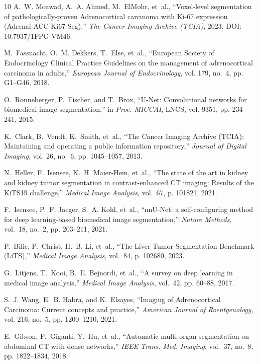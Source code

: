 \documentclass[conference]{IEEEtran}
\begin{document}
\begin{thebibliography}{10}
A.~W. Moawad, A.~A. Ahmed, M.~ElMohr, et~al., ``Voxel-level segmentation of pathologically-proven Adrenocortical carcinoma with Ki-67 expression (Adrenal-ACC-Ki67-Seg),'' \emph{The Cancer Imaging Archive (TCIA)}, 2023. DOI: 10.7937/1FPG-VM46.

M.~Fassnacht, O.~M. Dekkers, T.~Else, et~al., ``European Society of Endocrinology Clinical Practice Guidelines on the management of adrenocortical carcinoma in adults,'' \emph{European Journal of Endocrinology}, vol. 179, no.~4, pp. G1--G46, 2018.

O.~Ronneberger, P.~Fischer, and T.~Brox, ``U-Net: Convolutional networks for biomedical image segmentation,'' in \emph{Proc. MICCAI}, LNCS, vol. 9351, pp. 234--241, 2015.

K.~Clark, B.~Vendt, K.~Smith, et~al., ``The Cancer Imaging Archive (TCIA): Maintaining and operating a public information repository,'' \emph{Journal of Digital Imaging}, vol. 26, no.~6, pp. 1045--1057, 2013.

N.~Heller, F.~Isensee, K.~H. Maier-Hein, et~al., ``The state of the art in kidney and kidney tumor segmentation in contrast-enhanced CT imaging: Results of the KiTS19 challenge,'' \emph{Medical Image Analysis}, vol.~67, p. 101821, 2021.

F.~Isensee, P.~F. Jaeger, S.~A. Kohl, et~al., ``nnU-Net: a self-configuring method for deep learning-based biomedical image segmentation,'' \emph{Nature Methods}, vol.~18, no.~2, pp. 203--211, 2021.

P.~Bilic, P.~Christ, H.~B. Li, et~al., ``The Liver Tumor Segmentation Benchmark (LiTS),'' \emph{Medical Image Analysis}, vol.~84, p. 102680, 2023.

G.~Litjens, T.~Kooi, B.~E. Bejnordi, et~al., ``A survey on deep learning in medical image analysis,'' \emph{Medical Image Analysis}, vol.~42, pp. 60--88, 2017.

S.~J. Wang, E.~B. Habra, and K.~Elsayes, ``Imaging of Adrenocortical Carcinoma: Current concepts and practice,'' \emph{American Journal of Roentgenology}, vol. 216, no.~5, pp. 1200--1210, 2021.

E.~Gibson, F.~Giganti, Y.~Hu, et~al., ``Automatic multi-organ segmentation on abdominal CT with dense networks,'' \emph{IEEE Trans. Med. Imaging}, vol.~37, no.~8, pp. 1822--1834, 2018.
\end{thebibliography}
\end{document}
